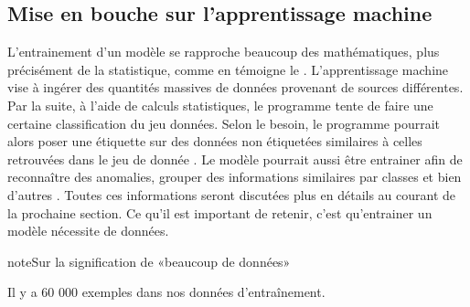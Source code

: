 \documentclass[letterpaper,10pt,french]{sphinxmanual}
\begin{document}
\subsection{Mise en bouche sur l’apprentissage machine}
\label{\detokenize{preprocessing:mise-en-bouche-sur-lapprentissage-machine}}
L’entrainement d’un modèle se rapproche beaucoup des mathématiques, plus précisément de la statistique, comme en témoigne le  . L’apprentissage machine vise à ingérer des quantités massives de données provenant de sources différentes. Par la suite, à l’aide de calculs statistiques, le programme tente de faire une certaine classification du jeu données. Selon le besoin, le programme pourrait alors poser une étiquette sur des données non étiquetées similaires à celles retrouvées dans le jeu de donnée . Le modèle pourrait aussi être entrainer afin de reconnaître des anomalies, grouper des informations similaires par classes et bien d’autres . Toutes ces informations seront discutées plus en détails au courant de la prochaine section. Ce qu’il est important de retenir, c’est qu’entrainer un modèle nécessite  de données.

\begin{sphinxadmonition}{note}{Sur la signification de «beaucoup de données»}

Il y a 60 000 exemples dans nos données d’entraînement.

\begin{sphinxVerbatim}[commandchars=\\\{\}]
 \PYG{p}{[} \PYG{p}{]} 
\PYG{p}{[} \PYG{p}{]}   
\end{sphinxVerbatim}
\end{sphinxadmonition}
\end{document}
